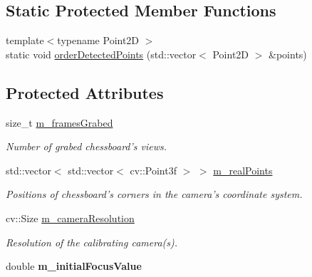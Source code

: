 \subsection*{Static Protected Member Functions}
\begin{DoxyCompactItemize}
\item 
{\footnotesize template$<$typename Point2D $>$ }\\static void \hyperlink{classVAbstractCalibrator_aa1ce901379c3c1464887a3ef89059e60}{orderDetectedPoints} (std::vector$<$ Point2D $>$ \&points)
\end{DoxyCompactItemize}
\subsection*{Protected Attributes}
\begin{DoxyCompactItemize}
\item 
\hypertarget{classVAbstractCalibrator_ae21ea1292d7c78c8bc995fb2820e2119}{
size\_\-t \hyperlink{classVAbstractCalibrator_ae21ea1292d7c78c8bc995fb2820e2119}{m\_\-framesGrabed}}
\label{classVAbstractCalibrator_ae21ea1292d7c78c8bc995fb2820e2119}

\begin{DoxyCompactList}\small\item\em Number of grabed chessboard's views. \item\end{DoxyCompactList}\item 
\hypertarget{classVAbstractCalibrator_aebea62e01958bad93f8f56eadcf96d07}{
std::vector$<$ std::vector$<$ cv::Point3f $>$ $>$ \hyperlink{classVAbstractCalibrator_aebea62e01958bad93f8f56eadcf96d07}{m\_\-realPoints}}
\label{classVAbstractCalibrator_aebea62e01958bad93f8f56eadcf96d07}

\begin{DoxyCompactList}\small\item\em Positions of chessboard's corners in the camera's coordinate system. \item\end{DoxyCompactList}\item 
\hypertarget{classVAbstractCalibrator_a236338405da6efedfa91323af74da459}{
cv::Size \hyperlink{classVAbstractCalibrator_a236338405da6efedfa91323af74da459}{m\_\-cameraResolution}}
\label{classVAbstractCalibrator_a236338405da6efedfa91323af74da459}

\begin{DoxyCompactList}\small\item\em Resolution of the calibrating camera(s). \item\end{DoxyCompactList}\item 
\hypertarget{classVAbstractCalibrator_a94f9700184fc2c69a72aa56e661be6f4}{
double {\bfseries m\_\-initialFocusValue}}
\label{classVAbstractCalibrator_a94f9700184fc2c69a72aa56e661be6f4}

\end{DoxyCompactItemize}
